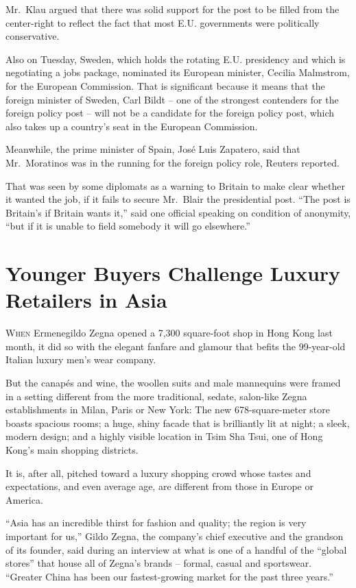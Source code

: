 ﻿\documentclass[12pt]{article}
\begin{document}
Mr.~Klau argued that there was solid support for the post to be filled from the center-right to
reflect the fact that most E.U. governments were politically conservative.

Also on Tuesday, Sweden, which holds the rotating E.U. presidency and which is negotiating a jobs
package, nominated its European minister, Cecilia Malmstrom, for the European Commission. That is
significant because it means that the foreign minister of Sweden, Carl Bildt -- one of the strongest
contenders for the foreign policy post -- will not be a candidate for the foreign policy post, which
also takes up a country's seat in the European Commission.

Meanwhile, the prime minister of Spain, Jos\'e Luis Zapatero, said that Mr.~Moratinos was in the
running for the foreign policy role, Reuters reported.

That was seen by some diplomats as a warning to Britain to make clear whether it wanted the job, if
it fails to secure Mr.~Blair the presidential post. ``The post is Britain's if Britain wants it,''
said one official speaking on condition of anonymity, ``but if it is unable to field somebody it
will go elsewhere.''

\section{Younger Buyers Challenge Luxury Retailers in Asia}

\lettrine{W}{hen} Ermenegildo Zegna opened a 7,300 square-foot shop in Hong
Kong last month, it did so with the elegant fanfare and glamour that befits the 99-year-old Italian
luxury men's wear company.

But the canap\'es and wine, the woollen suits and male mannequins were framed in a setting different
from the more traditional, sedate, salon-like Zegna establishments in Milan, Paris or New York: The
new 678-square-meter store boasts spacious rooms; a huge, shiny facade that is brilliantly lit at
night; a sleek, modern design; and a highly visible location in Tsim Sha Tsui, one of Hong Kong's
main shopping districts.

It is, after all, pitched toward a luxury shopping crowd whose tastes and expectations, and even
average age, are different from those in Europe or America.

``Asia has an incredible thirst for fashion and quality; the region is very important for us,''
Gildo Zegna, the company's chief executive and the grandson of its founder, said during an interview
at what is one of a handful of the ``global stores'' that house all of Zegna's brands -- formal,
casual and sportswear. ``Greater China has been our fastest-growing market for the past three
years.''
\end{document}

